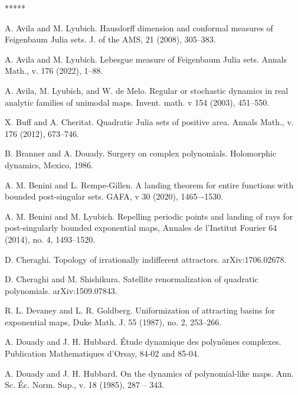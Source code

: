 
\begin{thebibliography}{*****}





 A. Avila and M. Lyubich. Hausdorff dimension and conformal measures of Feigenbaum Julia sets. J. of the AMS, 21 (2008), 305--383.

 A. Avila and M. Lyubich. 
Lebesgue measure of Feigenbaum Julia sets. Annals Math., v. 176 (2022), 1--88.

 A. Avila, M. Lyubich, and W. de Melo. Regular or stochastic dynamics in real analytic families of unimodal maps. Invent. math. v 154 (2003), 451--550. 


 X. Buff and A. Cheritat. Quadratic Julia sets of
  positive area. Annals Math., v. 176 (2012), 673--746.

 B. Branner and A. Douady. Surgery on complex polynomials. Holomorphic dynamics, {M}exico, 1986.



  A. M. Benini and L. Rempe-Gillen. A landing theorem for entire functions with bounded post-singular sets. GAFA, v 30 (2020), 1465–-1530.


 A. M. Benini and M. Lyubich. Repelling periodic points and landing of rays for post-singularly bounded exponential maps, Annales de l’Institut Fourier 64 (2014), no. 4, 1493--1520.



  D. Cheraghi. Topology of irrationally indifferent attractors. arXiv:1706.02678.

  D. Cheraghi and M. Shishikura. Satellite renormalization of quadratic polynomials. arXiv:1509.07843. 


 R. L. Devaney and  L. R. Goldberg. Uniformization of attracting basins for exponential maps, Duke Math. J. 55 (1987), no. 2, 253--266.



  A. Douady and J. H. Hubbard. 
  \'{E}tude dynamique des polyn\^{o}mes complexes.
 Publication Mathematiques d'Orsay,
 84-02 and 85-04.


 A. Douady and J. H. Hubbard. On the dynamics of polynomial-like maps.
   Ann. Sc. \'{E}c. Norm. Sup., v. 18 (1985), 287 -- 343.



\end{thebibliography}
